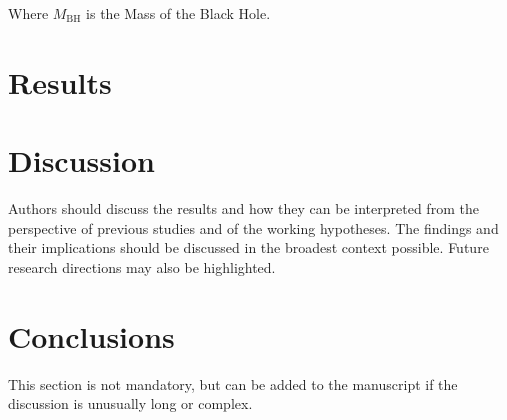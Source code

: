 \documentclass[journal,article,submit,pdftex,moreauthors]{Definitions/mdpi}
\begin{document}
Where $M_{\mathrm{BH}}$ is the Mass of the Black Hole.



\section{Results}



\section{Discussion}

Authors should discuss the results and how they can be interpreted from the perspective of previous studies and of the working hypotheses. The findings and their implications should be discussed in the broadest context possible. Future research directions may also be highlighted.

\section{Conclusions}

This section is not mandatory, but can be added to the manuscript if the discussion is unusually long or complex.



\vspace{6pt} 


\end{document}
